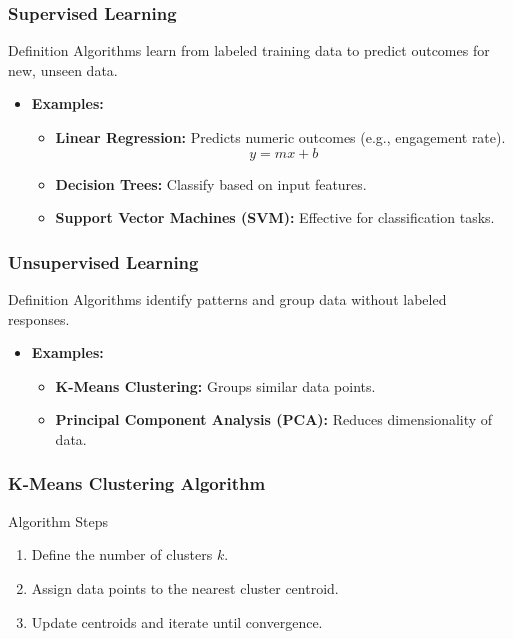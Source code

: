 \documentclass{beamer}
\begin{document}
\begin{frame}[fragile]
    \frametitle{Supervised Learning}
    \begin{block}{Definition}
        Algorithms learn from labeled training data to predict outcomes for new, unseen data.
    \end{block}
    \begin{itemize}
        \item \textbf{Examples:}
            \begin{itemize}
                \item \textbf{Linear Regression:} Predicts numeric outcomes (e.g., engagement rate).
                    \begin{equation}
                        y = mx + b
                    \end{equation}
                \item \textbf{Decision Trees:} Classify based on input features.
                \item \textbf{Support Vector Machines (SVM):} Effective for classification tasks.
            \end{itemize}
    \end{itemize}
\end{frame}

\begin{frame}[fragile]
    \frametitle{Unsupervised Learning}
    \begin{block}{Definition}
        Algorithms identify patterns and group data without labeled responses.
    \end{block}
    \begin{itemize}
        \item \textbf{Examples:}
            \begin{itemize}
                \item \textbf{K-Means Clustering:} Groups similar data points.
                \item \textbf{Principal Component Analysis (PCA):} Reduces dimensionality of data.
            \end{itemize}
    \end{itemize}
\end{frame}

\begin{frame}[fragile]
    \frametitle{K-Means Clustering Algorithm}
    \begin{block}{Algorithm Steps}
        \begin{enumerate}
            \item Define the number of clusters \(k\).
            \item Assign data points to the nearest cluster centroid.
            \item Update centroids and iterate until convergence.
        \end{enumerate}
    \end{block}
\end{frame}
\end{document}
